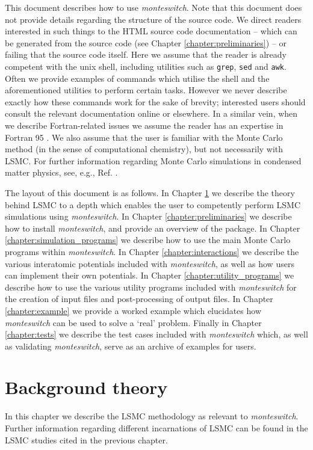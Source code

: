 \documentclass{report}
\begin{document}
This document describes how to use \emph{monteswitch}. Note that this document does not provide details regarding the structure of the source code. 
We direct readers interested in such things to the HTML source code documentation -- which can be generated from the source code (see Chapter
\ref{chapter:preliminaries}) -- or failing that the source code itself. Here we assume that the reader is already competent with the unix shell, 
including utilities such as \texttt{grep}, \texttt{sed} and \texttt{awk}. Often we provide examples of commands which utilise the shell and the 
aforementioned utilities to perform certain tasks. However we never describe exactly how these commands work for the sake of brevity; interested users
should consult the relevant documentation online or elsewhere. In a similar vein, when we describe Fortran-related issues we assume the reader has 
an expertise in Fortran 95 . We also assume that the user is familiar with the Monte Carlo method (in the sense of computational
chemistry), but not necessarily with LSMC. For further information regarding Monte Carlo simulations in condensed 
matter physics, see, e.g., Ref. \cite{book:Frenkel}. 

The layout of this document is as follows. In Chapter \ref{chapter:background} we describe the theory behind LSMC to a depth which enables the user to 
competently perform LSMC simulations using \emph{monteswitch}.
In Chapter \ref{chapter:preliminaries} we describe how to install \emph{monteswitch}, and provide
an overview of the package. In Chapter \ref{chapter:simulation_programs} we describe how to use the main Monte Carlo programs within
\emph{monteswitch}. In Chapter \ref{chapter:interactions} we describe the various interatomic potentials included with \emph{monteswitch}, as well as
how users can implement their own potentials. In Chapter \ref{chapter:utility_programs} we describe how to use the various utility
programs included with \emph{monteswitch} for the creation of input files and post-processing of output files. In Chapter \ref{chapter:example}
we provide a worked example which elucidates how \emph{monteswitch} can be used to solve a `real' problem. Finally in Chapter \ref{chapter:tests}
we describe the test cases included with \emph{monteswitch} which, as well as validating \emph{monteswitch}, serve as an archive of examples
for users.




\chapter{Background theory}\label{chapter:background}
In this chapter we describe the LSMC methodology as relevant to \emph{monteswitch}. Further information regarding different incarnations of
LSMC can be found in the LSMC studies cited in the previous chapter.
\end{document}
